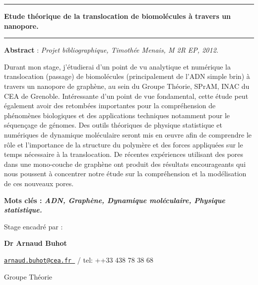 \documentclass[a4paper,11pt]{article}
\begin{document}
\begin{center}

\vspace{1.5cm}

\rule[11pt]{5cm}{0.5pt}

\textbf{\huge Etude théorique de la translocation de
biomolécules à travers un nanopore.}

\rule{5cm}{0.5pt}

\vspace{1.5cm}

\parbox{15cm}{\small
\textbf{Abstract} : \it Projet bibliographique, Timothée Menais, M 2R EP, 2012.

\vspace{0.5cm}
\rm Durant mon stage, j'étudierai d'un point de vu analytique et numérique la translocation (passage) de biomolécules (principalement de l'ADN simple brin) à travers un nanopore de graphène, au sein du Groupe Théorie, SPrAM, INAC du CEA de Grenoble. Intéressante d'un point de vue fondamental, cette étude peut également avoir des retombées importantes pour la compréhension de phénomènes biologiques et des applications techniques notamment pour le séquençage de génomes. Des outils théoriques de physique statistique et numériques de dynamique moléculaire seront mis en œuvre afin de comprendre le rôle et l'importance de la structure du polymère et des forces appliquées sur le temps nécessaire à la translocation. De récentes expériences utilisant des pores dans une mono-couche de graphène ont produit des résultats encourageants qui nous poussent à concentrer notre étude sur la compréhension et la modélisation de ces nouveaux pores.
} %


\vspace{0.5cm}

\parbox{15cm}{
\textbf{Mots clés : \it ADN, Graphène, Dynamique moléculaire, Physique statistique.} }%

\vspace{0.5cm}

\parbox{15cm}{
Stage encadré par :

{\bf Dr Arnaud Buhot }

\href{mailto:	arnaud.buhot@cea.fr }{\tt 	arnaud.buhot@cea.fr }  / tel: ++33 438 78 38 68



Groupe Théorie

}
\end{center}
\end{document}
